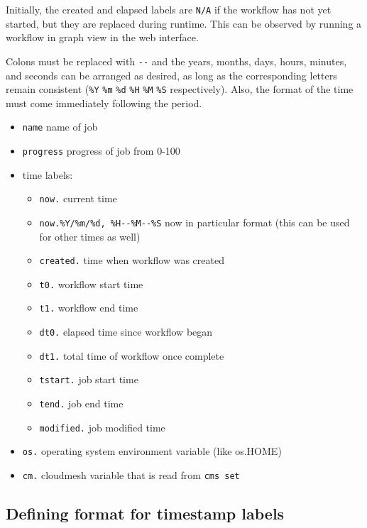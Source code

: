 Initially, the created and elapsed labels are \texttt{N/A} if the
workflow has not yet started, but they are replaced during runtime. This
can be observed by running a workflow in graph view in the web
interface.

Colons must be replaced with \texttt{-\/-} and the years, months, days,
hours, minutes, and seconds can be arranged as desired, as long as the
corresponding letters remain consistent (\texttt{\%Y} \texttt{\%m}
\texttt{\%d} \texttt{\%H} \texttt{\%M} \texttt{\%S} respectively). Also,
the format of the time must come immediately following the period.

\begin{itemize}
\tightlist
\item
  \texttt{name} name of job
\item
  \texttt{progress} progress of job from 0-100
\item
  time labels:

  \begin{itemize}
  \tightlist
  \item
    \texttt{now.} current time
  \item
    \texttt{now.\%Y/\%m/\%d,\ \%H-\/-\%M-\/-\%S} now in particular
    format (this can be used for other times as well)
  \item
    \texttt{created.} time when workflow was created
  \item
    \texttt{t0.} workflow start time
  \item
    \texttt{t1.} workflow end time
  \item
    \texttt{dt0.} elapsed time since workflow began
  \item
    \texttt{dt1.} total time of workflow once complete
  \item
    \texttt{tstart.} job start time
  \item
    \texttt{tend.} job end time
  \item
    \texttt{modified.} job modified time
  \end{itemize}
\item
  \texttt{os.} operating system environment variable (like os.HOME)
\item
  \texttt{cm.} cloudmesh variable that is read from \texttt{cms\ set}
\end{itemize}

\hypertarget{defining-format-for-timestamp-labels}{%
\subsection{Defining format for timestamp
labels}\label{defining-format-for-timestamp-labels}}

